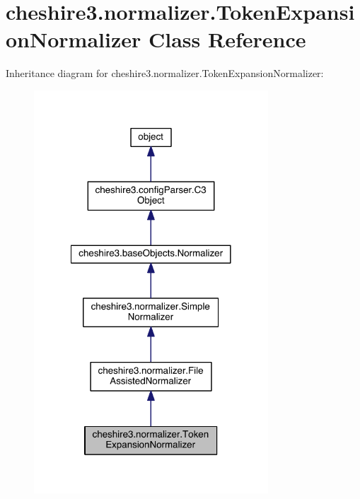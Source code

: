 \hypertarget{classcheshire3_1_1normalizer_1_1_token_expansion_normalizer}{\section{cheshire3.\-normalizer.\-Token\-Expansion\-Normalizer Class Reference}
\label{classcheshire3_1_1normalizer_1_1_token_expansion_normalizer}
}


Inheritance diagram for cheshire3.\-normalizer.\-Token\-Expansion\-Normalizer\-:
\nopagebreak
\begin{figure}[H]
\begin{center}
\leavevmode
\includegraphics[width=248pt]{classcheshire3_1_1normalizer_1_1_token_expansion_normalizer__inherit__graph}
\end{center}
\end{figure}


